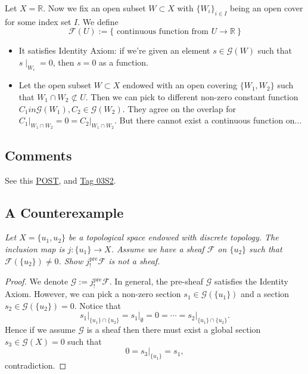 Let $X=\mathbb R$. 
Now we fix an open subset $W\subset X$ with $\{W_i\}_{i\in I}$ being an open cover for some index set $I$. We define 
\[\mathscr F(U):=\{\text{ continuous function from } U\to \mathbb R~\}\]

\begin{itemize}
    \item It satisfies Identity Axiom: if we're given an element $s\in \mathscr G(W)$ such that $s\mid_{W_i}=0$, then $s=0$ as a function.
    \item Let the open subset $W\subset X$ endowed with an open covering $\{W_1,W_2\}$ such that $W_1\cap W_2\not\subset U$. Then we can pick to different non-zero constant function $C_1
    in\mathscr G(W_1),C_2\in\mathscr G(W_2)$. They agree on the overlap for $C_1\vert_{W_1\cap W_2}=0=C_2\vert_{W_1\cap W_2}$. But there cannot exist a continuous function on... 
\end{itemize}

\subsection{Comments}

See this \href{https://math.stackexchange.com/questions/1682362/extension-by-zero-not-quasi-coherent}{POST}, and \href{https://stacks.math.columbia.edu/tag/03S2}{Tag 03S2}.

\subsection{A Counterexample}

\textit{Let $X=\{u_1,u_2\}$ be a topological space endowed with discrete topology. The inclusion map is $j:\{u_1\}\to X$. Assume we have a sheaf $\mathscr F$ on $\{u_2\}$ such that $\mathscr F(\{u_2\})\neq 0$. Show $j_{!}^{\text{pre}}\mathscr F$ is not a sheaf.}

\begin{proof}
    We denote $\mathscr G:=j_{!}^{\text{pre}}\mathscr F$.
    In general, the pre-sheaf $\mathscr G$ satisfies the Identity Axiom. However, we can pick a non-zero section $s_1\in\mathscr G(\{u_1\})$ and a section $s_2\in\mathscr G(\{u_2\})=0$. 
    Notice that 
    \[s_1\vert_{\{u_1\}\cap\{u_2\}}=s_1\vert_{\emptyset}=0=\cdots=s_2\vert_{\{u_1\}\cap\{u_2\}}.\] Hence if we assume $\mathscr G$ is a sheaf then there must exist a global section $s_3\in \mathscr G(X)=0$ such that 
    \[0=s_3\vert_{\{u_1\}}=s_1,\] contradiction.
\end{proof}


